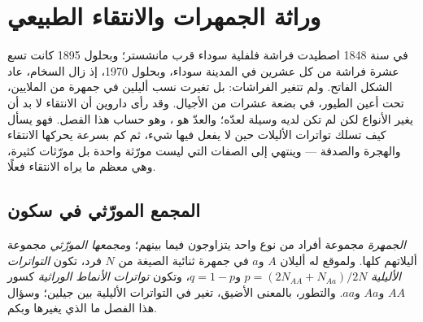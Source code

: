 \chapter{وراثة الجمهرات والانتقاء الطبيعي}\label{ch:b2:population-genetics}

في سنة 1848 اصطيدت فراشة فلفلية سوداء قرب مانشستر؛ وبحلول 1895
كانت تسع عشرة فراشة من كل عشرين في المدينة سوداء، وبحلول 1970، إذ
زال السخام، عاد الشكل الفاتح. ولم تتغير الفراشات: بل تغيرت
نسب أليلين في جمهرة من الملايين، تحت
أعين الطيور، في بضعة عشرات من الأجيال. وقد رأى داروين أن
الانتقاء لا بد أن يغير الأنواع لكن لم تكن لديه وسيلة لعدّه؛
والعدّ هو ، وهو حساب هذا
الفصل. فهو يسأل كيف تسلك تواترات الأليلات حين لا يفعل فيها
شيء، ثم كم بسرعة يحركها الانتقاء  والهجرة والصدفة
 --- وينتهي إلى الصفات التي ليست
مورّثة واحدة بل مورّثات كثيرة، وهي معظم ما يراه الانتقاء
فعلًا.

\section{المجمع المورّثي في سكون}

\begin{definition}\label{def:b2:population-genetics:frequencies}
\emph{الجمهرة} مجموعة أفراد من نوع واحد
يتزاوجون فيما بينهم؛ و\emph{مجمعها المورّثي} مجموعة أليلاتهم كلها.
ولموقع له أليلان $A$ و$a$ في جمهرة ثنائية الصيغة من
$N$ فرد، تكون \emph{التواترات الأليلية} $p = (2N_{AA} +
N_{Aa})/2N$ و$q = 1 - p$، وتكون \emph{تواترات الأنماط الوراثية}
كسور $AA$ و$Aa$ و$aa$. والتطور، بالمعنى الأضيق،
تغير في التواترات الأليلية بين جيلين؛
وسؤال هذا الفصل ما الذي يغيرها وبكم.
\end{definition}

